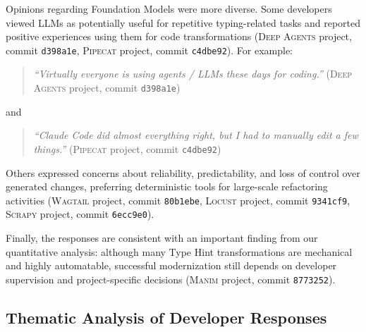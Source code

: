 Opinions regarding Foundation Models were more diverse. Some developers viewed LLMs as potentially useful for repetitive typing-related tasks and reported positive experiences using them for code transformations (\textsc{Deep Agents} project, commit \texttt{d398a1e}, \textsc{Pipecat} project, commit \texttt{c4dbe92}). For example:
\begin{quote}
\textit{``Virtually everyone is using agents / LLMs these days for coding.''} (\textsc{Deep Agents} project, commit \texttt{d398a1e})
\end{quote}

and
\begin{quote}
\textit{``Claude Code did almost everything right, but I had to manually edit a few things.''} (\textsc{Pipecat} project, commit \texttt{c4dbe92})
\end{quote}

Others expressed concerns about reliability, predictability, and loss of control over generated changes, preferring deterministic tools for large-scale refactoring activities (\textsc{Wagtail} project, commit \texttt{80b1ebe}, \textsc{Locust} project, commit \texttt{9341cf9}, \textsc{Scrapy} project, commit \texttt{6ecc9e0}).

Finally, the responses are consistent with an important finding from our quantitative analysis: although many Type Hint transformations are mechanical and highly automatable, successful modernization still depends on developer supervision and project-specific decisions (\textsc{Manim} project, commit \texttt{8773252}).


\subsection{Thematic Analysis of Developer Responses}




